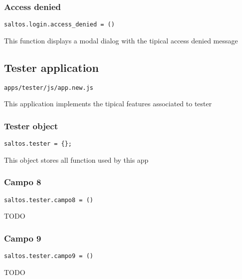 \documentclass[a4paper]{article}
\begin{document}
\hypertarget{toc92}{}
\subsubsection{Access denied}

\begin{lstlisting}
saltos.login.access_denied = ()
\end{lstlisting}

This function displays a modal dialog with the tipical access denied message

\hypertarget{toc93}{}
\subsection{Tester application}

\begin{lstlisting}
apps/tester/js/app.new.js
\end{lstlisting}

This application implements the tipical features associated to tester

\hypertarget{toc94}{}
\subsubsection{Tester object}

\begin{lstlisting}
saltos.tester = {};
\end{lstlisting}

This object stores all function used by this app

\hypertarget{toc95}{}
\subsubsection{Campo 8}

\begin{lstlisting}
saltos.tester.campo8 = ()
\end{lstlisting}

TODO

\hypertarget{toc96}{}
\subsubsection{Campo 9}

\begin{lstlisting}
saltos.tester.campo9 = ()
\end{lstlisting}

TODO

\hypertarget{toc97}{}
\end{document}
